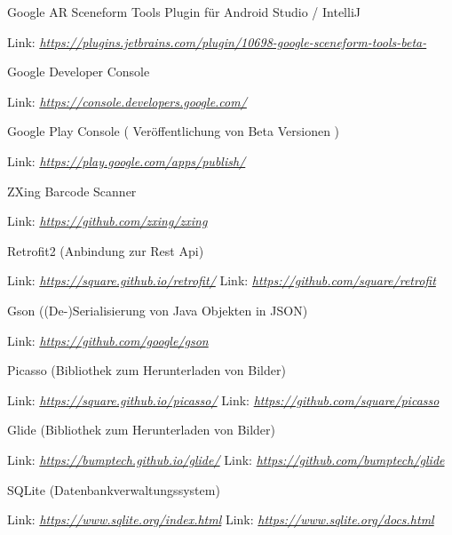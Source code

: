 \documentclass{scrartcl}
\begin{document}
\noindent Google AR Sceneform Tools Plugin für Android Studio / IntelliJ

\noindent Link: \textit{\url{https://plugins.jetbrains.com/plugin/10698-google-sceneform-tools-beta-} \newline}

\newpage

\noindent Google Developer Console 

\noindent Link: \textit{\url{https://console.developers.google.com/} \newline}

\noindent Google Play Console ( Veröffentlichung von Beta Versionen )

\noindent Link: \textit{\url{https://play.google.com/apps/publish/} \newline}

\noindent ZXing Barcode Scanner

\noindent Link: \textit{\url{https://github.com/zxing/zxing} \newline}

\noindent Retrofit2 (Anbindung zur Rest Api)

\noindent Link: \textit{\url{https://square.github.io/retrofit/} \newline}
\noindent Link: \textit{\url{https://github.com/square/retrofit} \newline}

\noindent Gson ((De-)Serialisierung von Java Objekten in JSON)

\noindent Link: \textit{\url{https://github.com/google/gson} \newline}

\noindent Picasso (Bibliothek zum Herunterladen von Bilder)

\noindent Link: \textit{\url{https://square.github.io/picasso/} \newline}
\noindent Link: \textit{\url{https://github.com/square/picasso} \newline}

\noindent Glide (Bibliothek zum Herunterladen von Bilder)

\noindent Link: \textit{\url{https://bumptech.github.io/glide/} \newline}
\noindent Link: \textit{\url{https://github.com/bumptech/glide} \newline}

\noindent SQLite (Datenbankverwaltungssystem)

\noindent Link: \textit{\url{https://www.sqlite.org/index.html} \newline}
\noindent Link: \textit{\url{https://www.sqlite.org/docs.html} \newline}
\end{document}

